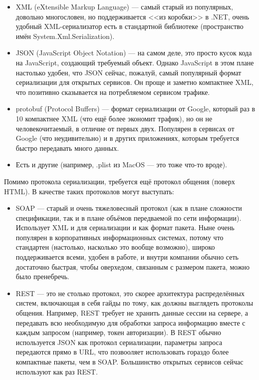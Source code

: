 \documentclass{../../text-style}
\begin{document}
\begin{itemize}
    \item XML (eXtensible Markup Language) --- самый старый из популярных, довольно многословен, но поддерживается <<из коробки>> в .NET, очень удобный XML-сериализатор есть в стандартной библиотеке (пространство имён System.Xml.Serialization).
    \item JSON (JavaScript Object Notation) --- на самом деле, это просто кусок кода на JavaScript, создающий требуемый объект. Однако JavaScript в этом плане настолько удобен, что JSON сейчас, пожалуй, самый популярный формат сериализации для открытых сервисов. Он проще и заметно компактнее XML, что позитивно сказывается на потребляемом сервисом трафике.
    \item protobuf (Protocol Buffers) --- формат сериализации от Google, который раз в 10 компактнее XML (что ещё более экономит трафик), но он не человекочитаемый, в отличие от первых двух. Популярен в сервисах от Google (что неудивительно) и в других приложениях, которым требуется быстро передавать много данных.
    \item Есть и другие (например, .plist из MacOS --- это тоже что-то вроде).
\end{itemize}

Помимо протокола сериализации, требуется ещё протокол общения (поверх HTML). В качестве таких протоколов могут выступать:

\begin{itemize}
    \item SOAP --- старый и очень тяжеловесный протокол (как в плане сложности спецификации, так и в плане объёмов передваемой по сети информации). Использует XML и для сериализации и как формат пакета. Ныне очень популярен в корпоративных информационных системах, потому что стандартен (настолько, насколько это вообще возможно), широко поддерживается всеми, удобен в работе, и внутри компании обычно сеть достаточно быстрая, чтобы оверхедом, связанным с размером пакета, можно было пренебречь.
    \item REST --- это не столько протокол, это скорее архитектура распределённых систем, включающая в себя гайды по тому, как должны выглядеть протоколы общения. Например, REST требует не хранить данные сессии на сервере, а передавать всю необходимую для обработки запроса информацию вместе с каждым запросом (например, токен авторизации). В REST обычно используется JSON как протокол сериализации, параметры запроса передаются прямо в URL, что позвооляет использовать гораздо более компактные пакеты, чем в SOAP. Большинство открытых сервисов сейчас используют как раз REST.
\end{itemize}
\end{document}
